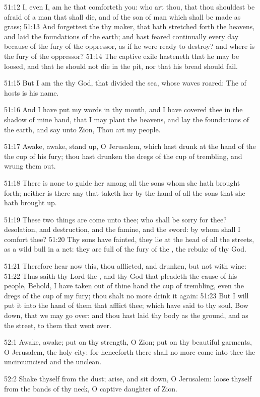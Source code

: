 51:12 I, even I, am he that comforteth you: who art thou, that thou shouldest be afraid of a man that shall die, and of the son of man which shall be made as grass; 51:13 And forgettest the \LORD thy maker, that hath stretched forth the heavens, and laid the foundations of the earth; and hast feared continually every day because of the fury of the oppressor, as if he were ready to destroy? and where is the fury of the oppressor?  51:14 The captive exile hasteneth that he may be loosed, and that he should not die in the pit, nor that his bread should fail.

51:15 But I am the \LORD thy God, that divided the sea, whose waves roared: The \LORD of hosts is his name.

51:16 And I have put my words in thy mouth, and I have covered thee in the shadow of mine hand, that I may plant the heavens, and lay the foundations of the earth, and say unto Zion, Thou art my people.

51:17 Awake, awake, stand up, O Jerusalem, which hast drunk at the hand of the \LORD the cup of his fury; thou hast drunken the dregs of the cup of trembling, and wrung them out.

51:18 There is none to guide her among all the sons whom she hath brought forth; neither is there any that taketh her by the hand of all the sons that she hath brought up.

51:19 These two things are come unto thee; who shall be sorry for thee?  desolation, and destruction, and the famine, and the sword: by whom shall I comfort thee?  51:20 Thy sons have fainted, they lie at the head of all the streets, as a wild bull in a net: they are full of the fury of the \LORD, the rebuke of thy God.

51:21 Therefore hear now this, thou afflicted, and drunken, but not with wine: 51:22 Thus saith thy Lord the \LORD, and thy God that pleadeth the cause of his people, Behold, I have taken out of thine hand the cup of trembling, even the dregs of the cup of my fury; thou shalt no more drink it again: 51:23 But I will put it into the hand of them that afflict thee; which have said to thy soul, Bow down, that we may go over: and thou hast laid thy body as the ground, and as the street, to them that went over.

52:1 Awake, awake; put on thy strength, O Zion; put on thy beautiful garments, O Jerusalem, the holy city: for henceforth there shall no more come into thee the uncircumcised and the unclean.

52:2 Shake thyself from the dust; arise, and sit down, O Jerusalem: loose thyself from the bands of thy neck, O captive daughter of Zion.

